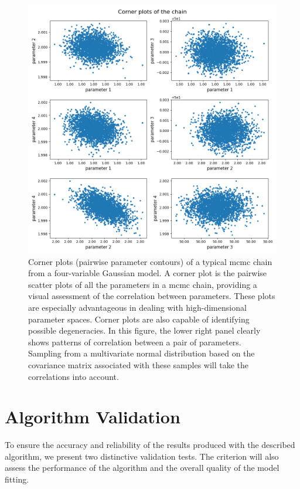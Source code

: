 \documentclass[12pt, TexShade, letterpaper]{report}
\begin{document}
\begin{figure}[h!]
\centering
\includegraphics[scale =0.6]{corner_plots.png}
\caption[Corner plots of an \gls{mcmc} chain]{Corner plots (pairwise parameter contours) of a typical \gls{mcmc} chain from a four-variable Gaussian model. 
 A corner plot is the pairwise scatter plots of all the parameters in a \gls{mcmc} chain, providing a visual assessment of the correlation between parameters. These plots are especially advantageous in dealing with high-dimensional parameter spaces. Corner plots are also capable of identifying possible degeneracies. In this figure, the lower right panel clearly shows patterns of correlation between a pair of parameters. Sampling from a multivariate normal distribution based on the covariance matrix associated with these samples will take the correlations into account.}
\label{fig:corner_plots}
\end{figure}

\section{Algorithm Validation}
\label{chap:method,sub:test}
To ensure the accuracy and reliability of the results produced with the described algorithm, we present two distinctive validation tests. The criterion will also assess the performance of the algorithm and the overall quality of the model fitting.\par
\end{document}
